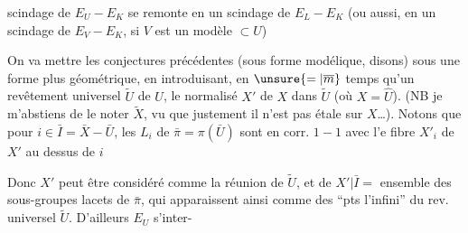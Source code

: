 scindage de $E_U-E_K$ se  remonte en un scindage de $E_L-E_K$ (ou aussi,  en un scindage de $E_V-E_K$, si $V$ est un modèle $\subset U$)

On va mettre les conjectures précédentes (sous forme modélique, disons) sous une forme plus géométrique, en introduisant, en $\unsure{=|\overline m}$ temps qu'un revêtement universel  $\widetilde U$ de $U$, le normalisé  $X'$ de $X$ dans $\widetilde U$ (où $X=\widehat U$). (NB je m'abstiens de le noter $\widetilde X$, vu que justement il n'est pas étale sur $X$\ldots). Notons que pour $i\in\bar I=\bar X-\bar U$, les  $L_i$ de $\bar\pi=\pi(\bar U)$ sont en corr. $1-1$ avec l'e fibre $X'_i$ de $X'$ au dessus de $i$


Donc $X'$ peut être considéré comme la réunion de $\widetilde U$, et de $X'|\bar I=$ ensemble des sous-groupes lacets de $\bar\pi$, qui apparaissent ainsi comme des ``pts  l'infini'' du rev. universel $\widetilde U$. D'ailleurs $E_U$ s'inter-
